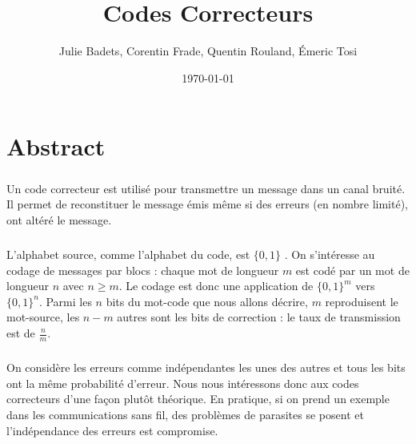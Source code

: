 \documentclass[a4paper,11pt]{report}
\title{Codes Correcteurs}
\author{Julie Badets, Corentin Frade, Quentin Rouland, Émeric Tosi}
\date{\today}
\begin{document}
    \maketitle{} %



    \setcounter{tocdepth}{1} %
    \renewcommand{\contentsname}{Sommaire} %
    \tableofcontents{} %
    \clearpage



\chapter*{Abstract}
        \paragraph{}
Un code correcteur est utilisé pour transmettre un message dans un canal bruité.
Il permet de reconstituer le message émis même si des erreurs (en nombre limité), ont altéré le message.
        \paragraph{}
L'alphabet source, comme l'alphabet du code, est $\{0,1\}$ .
On s'intéresse au codage de messages par blocs : chaque mot de longueur $m$ est codé par un mot de longueur $n$ avec $n \geq m$.
Le codage est donc une application de $\{0,1\}^{m}$  vers $\{0,1\}^{n}$.
Parmi les $n$ bits du mot-code que nous allons décrire, $m$ reproduisent le mot-source,
les $n-m$ autres sont les bits de correction : le taux de transmission est de $\frac{n}{m}$.
        \paragraph{}
On considère les erreurs comme indépendantes les unes des autres et tous les bits ont la même probabilité d'erreur.
Nous nous intéressons donc aux codes correcteurs d'une façon plutôt théorique.
En pratique, si on prend un exemple dans les communications sans fil,
des problèmes de parasites se posent et l'indépendance des erreurs est compromise.
\end{document}
